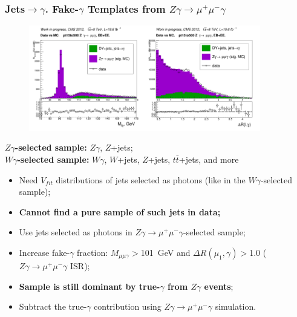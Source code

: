 \begin{frame}\frametitle{Jets$\rightarrow \gamma$. Fake-$\gamma$ Templates from $Z\gamma\rightarrow \mu^+ \mu^- \gamma$}

  \begin{figure}[htb]
    \begin{center}
       \includegraphics[width=0.45\textwidth]{../figs/ForPresentation/forDefense_Mllg.png}\includegraphics[width=0.45\textwidth]{../figs/ForPresentation/forDefense_dR.png}\\
    \end{center}
  \end{figure}

\tiny
{\bfseries{$Z\gamma$-selected sample:}} $Z\gamma$, $Z$+jets; \\
{\bfseries{$W\gamma$-selected sample:}} $W\gamma$, $W$+jets, $Z$+jets, $t\bar{t}$+jets, and more\\

  \begin{itemize}
     \tiny
     \item Need $V_{fit}$ distributions of jets selected as photons (like in the $W\gamma$-selected sample);
     \item {\bfseries{Cannot find a pure sample of such jets in data;}}
     \item Use jets selected as photons in $Z\gamma \rightarrow \mu^+ \mu^- \gamma$-selected sample;
     \item Increase fake-$\gamma$ fraction: $M_{\mu\mu\gamma}>$101~GeV and $\Delta R(\mu_{1},\gamma)>$1.0 ($Z\gamma\rightarrow\mu^+ \mu^- \gamma$ ISR);
     \item {\bfseries{Sample is still dominant by true-$\gamma$ from $Z\gamma$ events}};
     \item Subtract the true-$\gamma$ contribution using $Z\gamma \rightarrow \mu^+ \mu^- \gamma$ simulation.
  \end{itemize}

\end{frame}%
